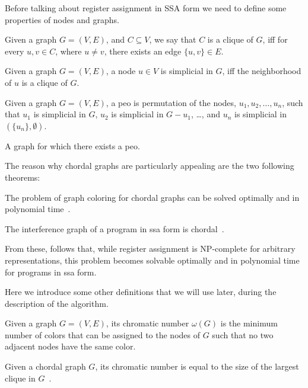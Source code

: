 Before talking about register assignment in SSA form we need to define some properties of nodes and graphs.

\begin{definition}[Clique]\label{def:clique}
  Given a graph $G = (V, E)$, and $C \subseteq V$, we say that $C$ is a clique of $G$, iff for every $u, v \in C$, where $u \neq v$, there exists an edge $\{ u, v \} \in E$.
\end{definition}

\begin{definition}\label{def:simplicial}
  Given a graph $G = (V, E)$, a node $u \in V$ is simplicial in $G$, iff the neighborhood of $u$ is a clique of $G$.
\end{definition}

\begin{definition}
  Given a graph $G = (V, E)$, a \gls{peo} is permutation of the nodes, $u_1, u_2, \dots, u_n$, such that $u_1$ is simplicial in $G$, $u_2$ is simplicial in $G - u_1$, \dots, and $u_n$ is simplicial in $(\{ u_n \}, \emptyset)$.
\end{definition}

\begin{definition}\label{def:chordal1}
  A graph for which there exists a \gls{peo}.
\end{definition}

The reason why chordal graphs are particularly appealing are the two following theorems:

\begin{theorem}
  The problem of graph coloring for chordal graphs can be solved optimally and in polynomial time~\cite{golumbic2004algorithmic}.
\end{theorem}

\begin{theorem}
  The interference graph of a program in \gls{ssa} form is chordal~\cite{HGG:2006:RA-SSA}.
\end{theorem}

From these, follows that, while register assignment is NP-complete for arbitrary representations, this problem becomes solvable optimally and in polynomial time for programs in \gls{ssa} form.

Here we introduce some other definitions that we will use later, during the description of the algorithm.

\begin{definition}\label{def:chromatic}
  Given a graph $G = (V, E)$, its chromatic number $\omega(G)$ is the minimum number of colors that can be assigned to the nodes of $G$ such that no two adjacent nodes have the same color.
\end{definition}

\begin{theorem}\label{thm:chordal-chromatic}
  Given a chordal graph $G$, its chromatic number is equal to the size of the largest clique in $G$~\cite{golumbic2004algorithmic}.
\end{theorem}